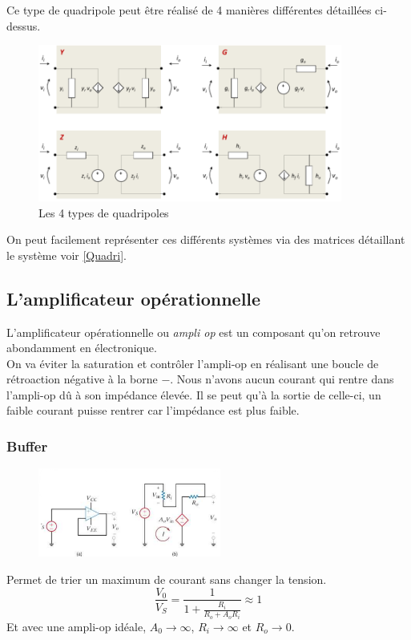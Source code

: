 \documentclass{report}
\begin{document}
Ce type de quadripole peut être réalisé de 4 manières différentes détaillées ci-dessus.
\begin{figure}[H]
\centering
\includegraphics[width=10cm]{img/YZGH.png}
\caption{Les 4 types de quadripoles}
\end{figure}
On peut facilement représenter ces différents systèmes via des matrices détaillant le système voir \ref{Quadri}.

\subsection{L'amplificateur opérationnelle}
L'amplificateur opérationnelle ou \textit{ampli op} est un composant qu'on retrouve abondamment en électronique.\\
On va éviter la saturation et contrôler l'ampli-op en réalisant une boucle de rétroaction négative à la borne $-$. Nous n'avons aucun courant qui rentre dans l'ampli-op dû à son impédance élevée. Il se peut qu'à la sortie de celle-ci, un faible courant puisse rentrer car l'impédance est plus faible.

\subsubsection{Buffer}
\begin{figure}[H]
\centering
\includegraphics[width=6cm]{img/buffer.png}
\end{figure}
Permet de trier un maximum de courant sans changer la tension.
\begin{equation}
\frac{V_0}{V_S} = \frac{1}{1 + \frac{R_i}{R_o + A_o R_i}} \approx 1
\end{equation}
Et avec une ampli-op idéale, $A_0 \rightarrow \infty$, $R_i \rightarrow \infty$ et $R_o \rightarrow 0$.
\end{document}
